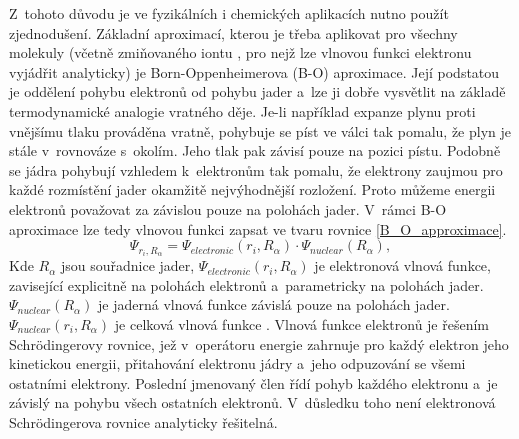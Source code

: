 \documentclass[
digital, %
table,   %
nolof,     %
nolot,     %
oneside,
]{fithesis3}
\begin{document}
Z~tohoto důvodu je ve fyzikálních i chemických aplikacích nutno použít zjednodušení. Základní aproximací, kterou je třeba aplikovat pro všechny molekuly (včetně zmiňovaného iontu , pro nejž lze vlnovou funkci elektronu vyjádřit analyticky) je Born-Oppenhei\-me\-ro\-va (B-O) aproximace.
Její podstatou je oddělení pohybu elektronů od pohybu jader a~lze ji dobře vysvětlit na základě termodynamické analogie vratného děje. Je-li například expanze plynu proti vnějšímu tlaku prováděna vratně, pohybuje se píst ve válci tak pomalu, že plyn je stále v~rovnováze s~okolím. Jeho tlak pak závisí pouze na pozici pístu. Podobně se jádra pohybují vzhledem k~elektronům tak pomalu, že elektrony zaujmou pro každé rozmístění jader okamžitě nejvýhodnější rozložení. Proto můžeme energii elektronů považovat za závislou pouze na polohách jader. V~rámci B-O aproximace lze tedy vlnovou funkci zapsat ve tvaru rovnice \ref{B_O_approximace}.
\begin{equation}
\Psi_{r_i,R_{\alpha}} = \Psi_{electronic}(r_i,R_{\alpha}) \cdot \Psi_{nuclear}(R_{\alpha}),
\label{B_O_approximace}
\end{equation}
Kde $R_{\alpha}$ jsou souřadnice jader, $\Psi_{electronic}(r_i,R_{\alpha})$ je elektronová vlnová funkce, zavisející explicitně na polohách elektronů a~parametricky na polohách jader. $\Psi_{nuclear}(R_{\alpha})$ je jaderná vlnová funkce závislá pouze na polohách jader. $ \Psi_{nuclear}(r_i, R_{\alpha}) $ je celková vlnová funkce \cite{lechamolecularmodeling}.
Vlnová funkce elektronů je řešením Schrödingerovy rovnice, jež v~operátoru energie zahrnuje pro každý elektron jeho kinetickou energii, přitahování elektronu jádry a~jeho odpuzování se všemi ostatními elektrony. Poslední jmenovaný člen řídí pohyb každého elektronu a~je závislý na pohybu všech ostatních elektronů. V~důsledku toho není elektronová Schrödingerova rovnice analyticky řešitelná.\\
\end{document}
